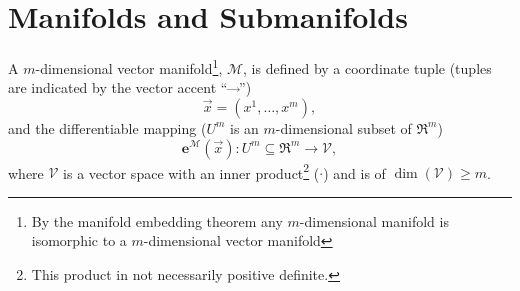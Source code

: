 \documentclass[12pt]{report}
\newcommand{\bm}[1]{\boldsymbol{#1}}
\newcommand{\lp}{\left (}
\newcommand{\rp}{\right )}
\newcommand{\f}[2]{{#1}\lp {#2} \rp}
\newcommand{\paren}[1]{\lp {#1} \rp}
\newcommand{\be}{\begin{equation}}
\newcommand{\ee}{\end{equation}}
\begin{document}
\section{Manifolds and Submanifolds}\label{sect_manifold}

A $m$-dimensional vector manifold\footnote{By the manifold embedding theorem any $m$-dimensional 
manifold is isomorphic to a $m$-dimensional vector manifold}, $\mathcal{M}$, is defined by a
coordinate tuple (tuples are indicated by the vector accent ``$\vec{\;\;\;}$'')
\be
	\vec{x} = \paren{x^{1},\dots,x^{m}},
\ee
and the differentiable mapping ($U^{m}$ is an $m$-dimensional subset of $\Re^{m}$)
\be
	\f{\bm{e}^{\mathcal{M}}}{\vec{x}}\colon U^{m}\subseteq\Re^{m}\rightarrow \mathcal{V},
\ee
where $\mathcal{V}$ is a vector space with an inner product\footnote{This product in not necessarily positive definite.} ($\cdot$) and is of $\f{\dim}{\mathcal{V}} \ge m$.
\end{document}
